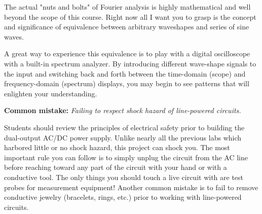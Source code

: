 The actual "nuts and bolts" of Fourier analysis is highly mathematical and well beyond the scope of this course.  Right now all I want you to grasp is the concept and significance of equivalence between arbitrary waveshapes and series of sine waves.

A great way to experience this equivalence is to play with a digital oscilloscope with a built-in spectrum analyzer.  By introducing different wave-shape signals to the input and switching back and forth between the time-domain (scope) and frequency-domain (spectrum) displays, you may begin to see patterns that will enlighten your understanding.

\vskip 10pt

\noindent
{\bf Common mistake: } {\it Failing to respect shock hazard of line-powered circuits.}

Students should review the principles of electrical safety prior to building the dual-output AC/DC power supply.  Unlike nearly all the previous labs which harbored little or no shock hazard, this project can shock you.  The most important rule you can follow is to simply unplug the circuit from the AC line before reaching toward any part of the circuit with your hand or with a conductive tool.  The only things you should touch a live circuit with are test probes for measurement equipment!  Another common mistake is to fail to remove conductive jewelry (bracelets, rings, etc.) prior to working with line-powered circuits.


